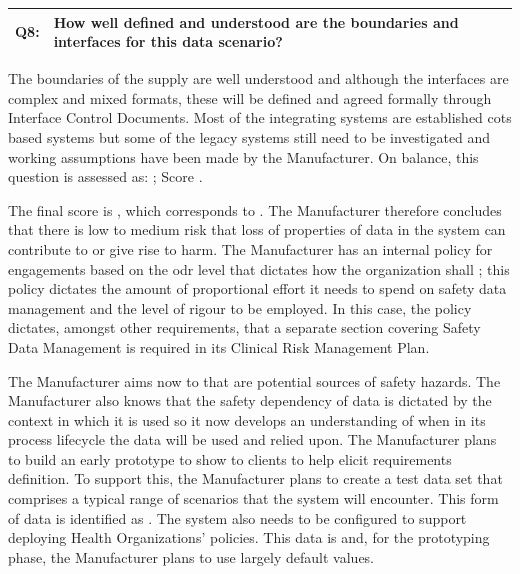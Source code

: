 \begin{longtable*}[H]
  {|L{}|L{}|}
  \hline
  Q8: & How well defined and understood are the boundaries and interfaces for this data scenario?\\
  \hline
\end{longtable*}

The boundaries of the supply are well understood and although the interfaces are complex and mixed formats, these will be defined and agreed formally through Interface Control Documents. Most of the integrating systems are established \gls{cots} based systems but some of the legacy systems still need to be investigated and working assumptions have been
made
by the Manufacturer. On balance, this question is assessed as: ; Score .

The final score is , which corresponds to . The Manufacturer therefore concludes that there is low to medium risk that loss of properties of data in the system can contribute to or give rise to harm. The Manufacturer has an internal policy for engagements based on the \gls{odr} level that dictates how the organization shall ; this policy dictates the amount of proportional effort it needs to spend on safety data management and the level of rigour to be employed. In this case, the policy dictates, amongst other requirements, that a separate section covering Safety Data Management is required in its Clinical Risk Management Plan.

The Manufacturer aims now to  that are potential sources of safety hazards. The Manufacturer also knows that the safety dependency of data is dictated by the context in which it is used so it now develops an understanding of when in its process lifecycle the data will be used and relied upon. The Manufacturer plans to build an early prototype to show to clients to help elicit requirements definition. To support this, the Manufacturer plans to create a test data set that comprises a typical range of scenarios that the system will encounter. This form of data is identified as . The system also needs to be configured to support deploying Health Organizations' policies. This data is  and, for the prototyping phase, the Manufacturer plans to use largely default values.

